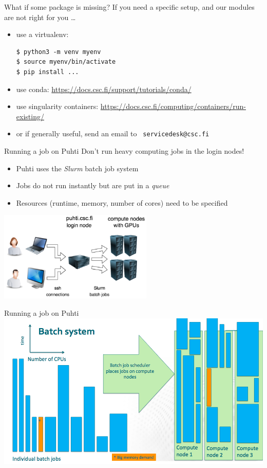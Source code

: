 \documentclass[aspectratio=1610,14pt]{beamer}
\newcommand{\link}[1]{\alert{\url{#1}}}
\newcommand{\vitem}{\vfill\item}
\begin{document}
\begin{frame}[fragile]{What if some package is missing?}
  If you need a specific setup, and our modules are not right for you \ldots
  \begin{itemize}
  \vitem use a virtualenv:
\begin{verbatim}
$ python3 -m venv myenv
$ source myenv/bin/activate
$ pip install ...
\end{verbatim}

  \vitem use conda: {\small \link{https://docs.csc.fi/support/tutorials/conda/}}
  \vitem use singularity containers: {\small \link{https://docs.csc.fi/computing/containers/run-existing/}}
    
  \vitem or if generally useful, send an email to \alert{\tt
      servicedesk@csc.fi}
  \end{itemize}
  
\end{frame}

\begin{frame}{Running a job on Puhti}
  \alert{Don't run heavy computing jobs in the login nodes!}
  \vspace{2mm}
  \begin{itemize}
  \item Puhti uses the \emph{Slurm} batch job system
  \item Jobs do not run instantly but are put in a \emph{queue}
  \item Resources (runtime, memory, number of cores) need to be specified
  \end{itemize}

  \vspace{-4mm}
  \begin{center}
    \includegraphics[width=0.55\textwidth]{slurm1.png}    
  \end{center}
\end{frame}

\begin{frame}{Running a job on Puhti}
  \includegraphics[width=\textwidth]{slurm2.png}
\end{frame}
\end{document}

